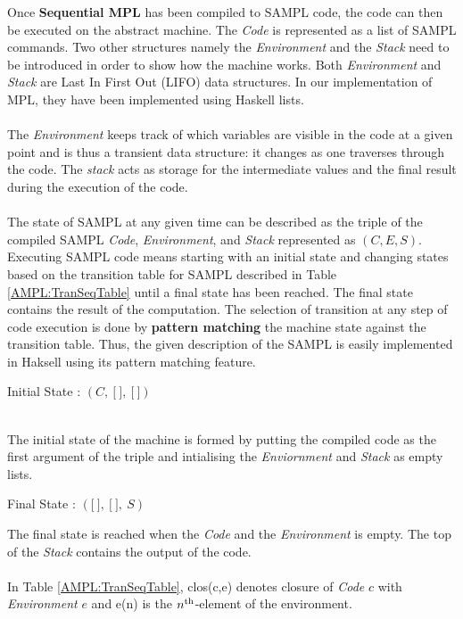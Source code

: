 \documentclass[11pt]{article}
\newcommand{\<}{\langle}
\renewcommand{\>}{\rangle}
\begin{document}
Once {\bf Sequential MPL} has been compiled to SAMPL code, the code can then be executed on the abstract machine. The {\em Code} is represented as a list of SAMPL commands. Two other structures namely the {\em Environment} and the {\em Stack} need to be introduced in order to show how the machine works. Both {\em Environment} and {\em Stack} are Last In First Out (LIFO) data structures. In our implementation of MPL, they have been implemented using Haskell lists. 
~~\\~~\\
The {\em Environment} keeps track of which variables are visible in the code at a given point and is thus a transient data structure: it changes as one traverses through the code. The {\em stack} acts as storage for the intermediate values and the final result during the execution of the code. 
~~\\~~\\ 
The state of SAMPL at any given time can be described as the triple of the compiled SAMPL {\em Code}, {\em Environment}, and {\em Stack} represented as $(C,E,S)$. Executing SAMPL code means starting with an initial state and changing states based on the transition table for SAMPL described in Table \ref {AMPL:TranSeqTable} until a final state has been reached. The final state contains the result of the computation. The selection of transition at any step of code execution is done by {\bf pattern matching} the machine state against the transition table. Thus, the given description of the SAMPL is easily implemented in Haksell using its pattern matching feature.
~~\\
\begin{center}
Initial State : $(C,~\lbrack~\rbrack,~\lbrack~\rbrack)$
\end{center}
~~\\
The initial state of the machine is formed by putting the compiled code as the first argument of the triple and intialising the {\em Enviornment} and {\em Stack} as empty lists.
~~\\
\begin{center}
Final State : $(\lbrack~\rbrack,~\lbrack~\rbrack,~S)$
~~\\
\end{center}
The final state is reached when the {\em Code} and the {\em Environment} is empty. The top of the {\em Stack} contains the output of the code.
~~\\~~\\
In Table \ref {AMPL:TranSeqTable}, {\sf clos(c,e)} denotes closure of {\em Code} $c$ with {\em Environment} $e$ and {\sf e(n)} is the $n^{\rm th}$-element of the environment.
\end{document}
